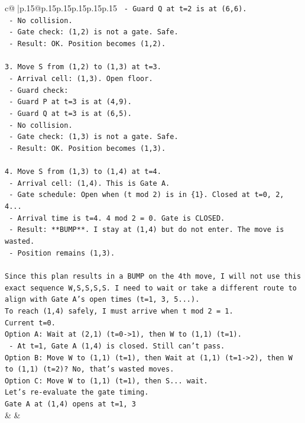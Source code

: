 \documentclass{article}
\begin{document}
{\begin{supertabular}{c@{$\;$}|p{.15\linewidth}@{}p{.15\linewidth}p{.15\linewidth}p{.15\linewidth}p{.15\linewidth}p{.15\linewidth}}
{{{\texttt{     {-} Guard Q at t=2 is at (6,6).} \\
\texttt{     {-} No collision.} \\
\texttt{   {-} Gate check: (1,2) is not a gate. Safe.} \\
\texttt{   {-} Result: OK. Position becomes (1,2).} \\
\\ 
\texttt{3. Move S from (1,2) to (1,3) at t=3.} \\
\texttt{   {-} Arrival cell: (1,3). Open floor.} \\
\texttt{   {-} Guard check:} \\
\texttt{     {-} Guard P at t=3 is at (4,9).} \\
\texttt{     {-} Guard Q at t=3 is at (6,5).} \\
\texttt{     {-} No collision.} \\
\texttt{   {-} Gate check: (1,3) is not a gate. Safe.} \\
\texttt{   {-} Result: OK. Position becomes (1,3).} \\
\\ 
\texttt{4. Move S from (1,3) to (1,4) at t=4.} \\
\texttt{   {-} Arrival cell: (1,4). This is Gate A.} \\
\texttt{   {-} Gate schedule: Open when (t mod 2) is in \{1\}. Closed at t=0, 2, 4...} \\
\texttt{   {-} Arrival time is t=4. 4 mod 2 = 0. Gate is CLOSED.} \\
\texttt{   {-} Result: **BUMP**. I stay at (1,4) but do not enter. The move is wasted.} \\
\texttt{   {-} Position remains (1,3).} \\
\\ 
\texttt{Since this plan results in a BUMP on the 4th move, I will not use this exact sequence W,S,S,S,S. I need to wait or take a different route to align with Gate A's open times (t=1, 3, 5...).} \\
\texttt{To reach (1,4) safely, I must arrive when t mod 2 = 1.} \\
\texttt{Current t=0.} \\
\texttt{Option A: Wait at (2,1) (t=0{-}>1), then W to (1,1) (t=1).} \\
\texttt{   {-} At t=1, Gate A (1,4) is closed. Still can't pass.} \\
\texttt{Option B: Move W to (1,1) (t=1), then Wait at (1,1) (t=1{-}>2), then W to (1,1) (t=2)? No, that's wasted moves.} \\
\texttt{Option C: Move W to (1,1) (t=1), then S... wait.} \\
\texttt{Let's re{-}evaluate the gate timing.} \\
\texttt{Gate A at (1,4) opens at t=1, 3} \\
            }
        }
    }
    & & \\ \\


\end{supertabular}}
\end{document}
